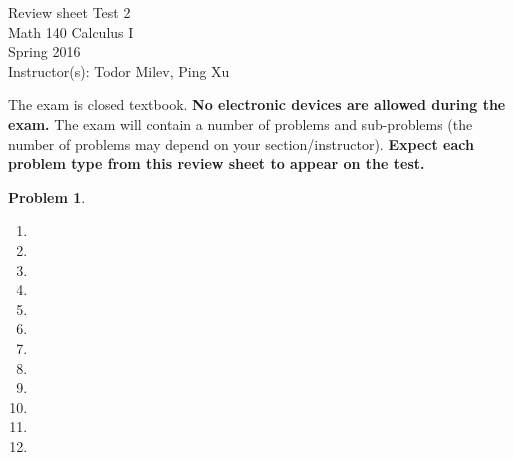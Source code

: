 \documentclass{article}
\renewcommand{\fcProblemRef}{\theproblem.\theenumi}
\newtheorem{problem}{Problem}
\begin{document}
\begin{center}
\Large
Review sheet Test 2 \\ Math 140 Calculus I \\ \normalsize Spring 2016 \\ Instructor(s): Todor Milev, Ping Xu
\end{center}



\noindent The exam is closed textbook. \textbf{No electronic devices are allowed during the exam. } The exam will contain a number of problems and sub-problems (the number of problems may depend on your section/instructor). \textbf{Expect each problem type from this review sheet to appear on the test.}%

\begin{problem}~
\begin{multicols}{2}
\begin{enumerate}[ref={\fcProblemRef}]
\item 
\item 
\item 
\item 
\item 
\item 
\item 

\item 

\item 

\item 

\item 

\item 

\end{enumerate}
\end{multicols}
\end{problem}


\end{document}
